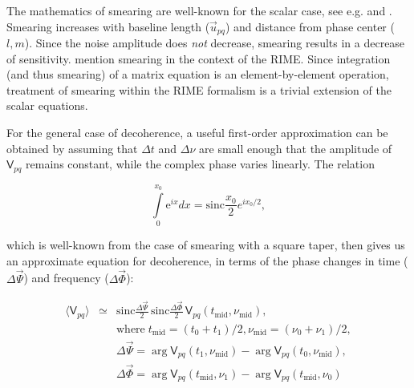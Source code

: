 \documentclass[referee]{aa}
\newcommand{\coh}[2]{\mathsf{{#1}}_{{#2}}}
\begin{document}
The mathematics of smearing are well-known for the scalar case, see e.g. \citet[Sect.~6.4]{tms} and \citet{Bridle:smearing}. Smearing increases with baseline length ($\vec u_{pq}$) and distance from phase center ($l,m$). Since the noise amplitude does {\em not} decrease, smearing results in a decrease of sensitivity. \citet{ME1} mention smearing in the context of the RIME. Since integration (and thus smearing) of a matrix equation is an element-by-element operation,  treatment of smearing within the RIME formalism is a trivial extension of the scalar equations.

For the general case of decoherence, a useful first-order approximation can be obtained by assuming that $\Delta t$ and $\Delta\nu$ are small enough that the amplitude of $\coh{V}{pq}$ remains constant, while the complex phase varies linearly. The relation

\[
\int\limits_{0}^{x_0}\mathrm{e}^{ix}dx = \mathrm{sinc}\frac{x_0}{2}e^{ix_0/2},
\]

which is well-known from the case of smearing with a square taper, then gives us an approximate equation for decoherence, in terms of the phase changes in time ($\Delta\vec\Psi$) and frequency ($\Delta\vec\Phi$):

\begin{eqnarray}\label{eq:smearing}
\langle \coh{V}{pq} \rangle & \simeq & \mathrm{sinc}\frac{\Delta\vec\Psi}{2}\,\mathrm{sinc}\frac{\Delta\vec\Phi}{2}\,\coh{V}{pq}(t_\mathrm{mid},\nu_\mathrm{mid}), \\
\nonumber && \mathrm{where} \; t_\mathrm{mid} = (t_0+t_1)/2, \nu_\mathrm{mid} = (\nu_0+\nu_1)/2, \\
\nonumber && \Delta\vec\Psi = \arg \coh{V}{pq}(t_1,\nu_\mathrm{mid}) - \arg \coh{V}{pq}(t_0,\nu_\mathrm{mid}), \\
\nonumber && \Delta\vec\Phi = \arg \coh{V}{pq}(t_\mathrm{mid},\nu_1) - \arg \coh{V}{pq}(t_\mathrm{mid},\nu_0) 
\end{eqnarray}
\end{document}
